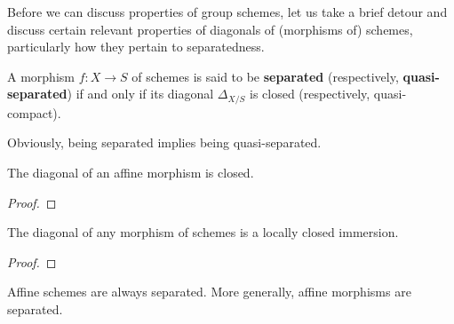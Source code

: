         Before we can discuss properties of group schemes, let us take a brief detour and discuss certain relevant properties of diagonals of (morphisms of) schemes, particularly how they pertain to separatedness.
        \begin{definition} \label{def: (quasi)_separatedness}
            A morphism $f: X \to S$ of schemes is said to be \textbf{separated} (respectively, \textbf{quasi-separated}) if and only if its diagonal $\Delta_{X/S}$ is closed (respectively, quasi-compact). 
        \end{definition}
        \begin{remark}
            Obviously, being separated implies being quasi-separated.
        \end{remark}
        \begin{lemma} \label{lemma: diagonals_of_affines_are_closed}
            The diagonal of an affine morphism is closed.
        \end{lemma}
            \begin{proof}
                
            \end{proof}
        \begin{proposition} \label{prop: diagonals_of_schemes_are_locally_closed_immersions}
            The diagonal of any morphism of schemes is a locally closed immersion.
        \end{proposition}
            \begin{proof}
                
            \end{proof}
        \begin{corollary} \label{coro: affines_are_separated}
            Affine schemes are always separated. More generally, affine morphisms are separated. 
        \end{corollary}
